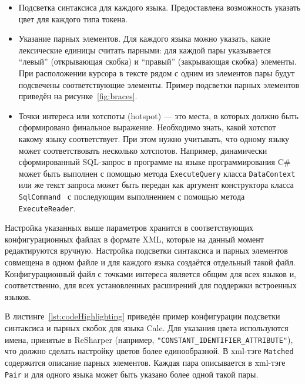\begin{itemize}
    \item Подсветка синтаксиса для каждого языка. Предоставлена возможность указать цвет для каждого типа токена.
    \item Указание парных элементов. Для каждого языка можно указать, какие лексические единицы считать парными: для каждой пары указывается ``левый'' (открывающая скобка) и ``правый'' (закрывающая скобка) элементы. При расположении курсора в тексте рядом с одним из элементов пары будут подсвечены соответствующие элементы. Пример подсветки парных элементов приведён на рисунке~\ref{fig:braces}.
    \item Точки интереса или хотспоты (hotspot) --- это места, в которых должно быть сформировано финальное выражение. Необходимо знать, какой хотспот какому языку соответствует. При этом нужно учитывать, что одному языку может соответствовать несколько хотспотов. Например, динамически сформированный SQL-запрос в программе на языке программирования C\# может быть выполнен с помощью метода \verb|ExecuteQuery| класса \verb|DataContext|~\cite{ExecuteQuery}
     или же текст запроса может быть передан как аргумент конструктора класса \verb|SqlCommand|~\cite{SqlCommand} с последующим выполнением с помощью метода \verb|ExecuteReader|.

\end{itemize}

Настройка указанных выше параметров хранится в соответствующих конфигурационных файлах в формате XML, которые на данный момент редактируются вручную. Настройка подсветки синтаксиса и парных элементов совмещена в одном файле и для каждого языка создаётся отдельный такой файл. Конфигурационный файл с точками интереса является общим для всех языков и, соответственно, для всех установленных расширений для поддержки встроенных языков.

В листинге~\ref{lst:codeHighlighting} приведён пример конфигурации подсветки синтаксиса и парных скобок для языка Calc. Для указания цвета используются имена, принятые в ReSharper (например, \verb|"CONSTANT_IDENTIFIER_ATTRIBUTE"|), что должно сделать настройку цветов более единообразной. В xml-тэге \verb|Matched| содержится описание парных элементов. Каждая пара описывается в xml-тэге \verb|Pair| и для одного языка может быть указано более одной такой пары.


